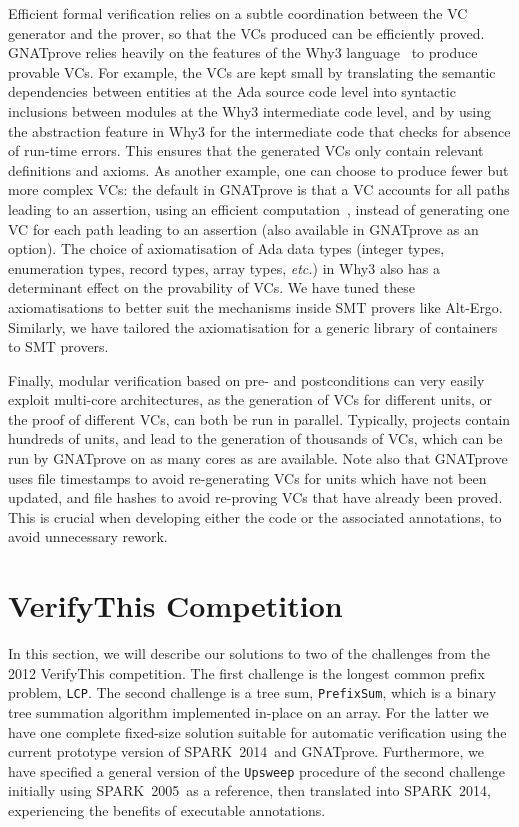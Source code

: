 \documentclass[sttt,final]{svjour}
\newcommand{\gnatprove}{GNATprove\xspace}
\newcommand{\oldspark}{SPARK~2005\xspace}
\newcommand{\newspark}{SPARK~2014\xspace}
\newcommand{\etc}{\textit{etc.}\xspace}
\begin{document}
Efficient formal verification relies on a subtle coordination between
the VC generator and the prover, so that the VCs produced can be
efficiently proved. \gnatprove relies heavily on the features of the
Why3 language~\cite{guitton2011boogie} to produce provable VCs. For
example, the VCs are kept small by translating the semantic
dependencies between entities at the Ada source code level into
syntactic inclusions between modules at the Why3 intermediate code
level, and by using the abstraction feature in Why3 for the
intermediate code that checks for absence of run-time errors. This
ensures that the generated VCs only contain relevant definitions and
axioms. As another example, one can choose to produce fewer but more
complex VCs: the default in \gnatprove is that a VC accounts for all
paths leading to an assertion, using an efficient
computation~\cite{leino2005ipl}, instead of generating one VC for each
path leading to an assertion (also available in \gnatprove as an
option). The choice of axiomatisation of Ada data types (integer
types, enumeration types, record types, array types, \etc) in Why3
also has a determinant effect on the provability of VCs. We have tuned
these axiomatisations to better suit the mechanisms inside SMT provers
like Alt-Ergo. Similarly, we have tailored the axiomatisation for a
generic library of containers~\cite{dross:2011:tap} to SMT provers.

Finally, modular verification based on pre- and postconditions can
very easily exploit multi-core architectures, as the generation of VCs
for different units, or the proof of different VCs, can both be run in
parallel. Typically, projects contain hundreds of units, and lead to
the generation of thousands of VCs, which can be run by \gnatprove on
as many cores as are available. Note also that \gnatprove uses file
timestamps to avoid re-generating VCs for units which have not been
updated, and file hashes to avoid re-proving VCs that have already
been proved. This is crucial when developing either the code or the
associated annotations, to avoid unnecessary rework.

\section{VerifyThis Competition}
\label{verifythis}
In this section, we will describe our solutions to two of the
challenges from the 2012 VerifyThis competition. The first challenge
is the longest common prefix problem, \verb|LCP|. The second challenge
is a tree sum, \verb|PrefixSum|, which is a binary tree summation
algorithm implemented in-place on an array. For the latter we have one
complete fixed-size solution suitable for automatic verification using
the current prototype version of \newspark\ and
\gnatprove. Furthermore, we have specified a general version of the
\verb|Upsweep| procedure of the second challenge initially using
\oldspark\ as a reference, then translated into \newspark,
experiencing the benefits of executable annotations.
\end{document}
